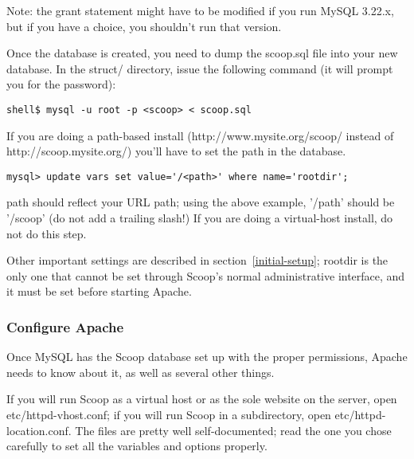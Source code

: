 Note: the grant statement might have to be modified if you run MySQL 3.22.x, but if you have a choice, you shouldn't run that version.

Once the database is created, you need to dump the scoop.sql file into your new database.  In the struct/ directory, issue the following command (it will prompt you for the password):

\begin{verbatim}
shell$ mysql -u root -p <scoop> < scoop.sql
\end{verbatim}

If you are doing a path-based install (http://www.mysite.org/scoop/ instead of http://scoop.mysite.org/) you'll have to set the path in the database.

\begin{verbatim}
mysql> update vars set value='/<path>' where name='rootdir';
\end{verbatim}

\latexhtml{$<$}{<}path\latexhtml{$>$}{>} should reflect your URL path; using the above example, '/\latexhtml{$<$}{<}path\latexhtml{$>$}{>}' should be '/scoop' (do not add a trailing slash!)  If you are doing a virtual-host install, do not do this step.

Other important settings are described in section~\ref{initial-setup}; rootdir is the only one that cannot be set through Scoop's normal administrative interface, and it must be set before starting Apache.

\subsubsection{Configure Apache}
\label{apache-config}

Once MySQL has the Scoop database set up with the proper permissions, Apache needs to know about it, as well as several other things.

If you will run Scoop as a virtual host or as the sole website on the server, open etc/httpd-vhost.conf; if you will run Scoop in a subdirectory, open etc/httpd-location.conf.  The files are pretty well self-documented; read the one you chose carefully to set all the variables and options properly.

